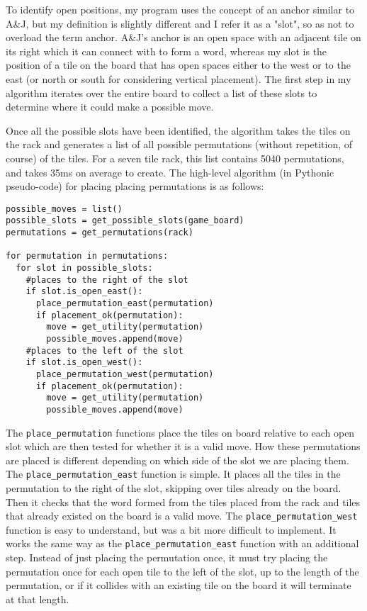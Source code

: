 \documentclass[letterpaper]{article}
\begin{document}
To identify open positions, my program uses the concept of an anchor similar to A\&J, but my definition is slightly different and I refer it as a "slot", so as not to overload the term anchor. A\&J's anchor is an open space with an adjacent tile on its right which it can connect with to form a word, whereas my slot is the position of a tile on the board that has open spaces either to the west or to the east (or north or south for considering vertical placement). The first step in my algorithm iterates over the entire board to collect a list of these slots to determine where it could make a possible move.

Once all the possible slots have been identified, the algorithm takes the tiles on the rack and generates a list of all possible permutations (without repetition, of course) of the tiles. For a seven tile rack, this list contains 5040 permutations, and takes 35ms on average to create. The high-level algorithm (in Pythonic pseudo-code) for placing placing permutations is as follows:

\lstset{language=Python}
\begin{lstlisting}[frame=single, breaklines=true]  % Start your code-block
possible_moves = list()
possible_slots = get_possible_slots(game_board)
permutations = get_permutations(rack)

for permutation in permutations:
  for slot in possible_slots:
    #places to the right of the slot
    if slot.is_open_east():
      place_permutation_east(permutation)
      if placement_ok(permutation):
        move = get_utility(permutation)
        possible_moves.append(move)
    #places to the left of the slot
    if slot.is_open_west():
      place_permutation_west(permutation)
      if placement_ok(permutation):
        move = get_utility(permutation)
        possible_moves.append(move)
\end{lstlisting}



The \texttt{place\_permutation} functions place the tiles on board relative to each open slot which are then tested for whether it is a valid move. How these permutations are placed is different depending on which side of the slot we are placing them. The \texttt{place\_permutation\_east} function is simple. It places all the tiles in the permutation to the right of the slot, skipping over tiles already on the board. Then it checks that the word formed from the tiles placed from the rack and tiles that already existed on the board is a valid move. The \texttt{place\_permutation\_west} function is easy to understand, but was a bit more difficult to implement. It works the same way as the \texttt{place\_permutation\_east} function with an additional step. Instead of just placing the permutation once, it must try placing the permutation once for each open tile to the left of the slot, up to the length of the permutation, or if it collides with an existing tile on the board it will terminate at that length.
\end{document}
